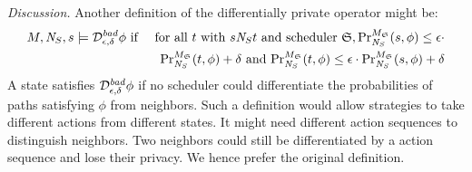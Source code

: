 \noindent
\emph{Discussion.}
Another definition of the differentially private operator
might be:
\begin{eqnarray*}
  M, \neighbor{S}, s \models \dpriv{\epsilon}{\delta}^{\mathit{bad}} \phi
  & \textmd{ if } &
  \textmd{for all } t \textmd{ with } s \neighbor{S} t \textmd{ and
  scheduler } \scheduler{S},
  \myPr{s}{M_{\scheduler{S}}}{\neighbor{S}}{\phi} \leq
  \epsilon \cdot\\
  && \myPr{t}{M_{\scheduler{S}}}{\neighbor{S}}{\phi} + \delta \textmd{ and }
  \myPr{t}{M_{\scheduler{S}}}{\neighbor{S}}{\phi} \leq
  \epsilon \cdot \myPr{s}{M_{\scheduler{S}}}{\neighbor{S}}{\phi}
  + \delta
\end{eqnarray*}
A state satisfies $\dpriv{\epsilon}{\delta}^{\mathit{bad}} \phi$ if
no scheduler could differentiate the probabilities of paths satisfying
$\phi$ from neighbors. Such a definition would allow strategies to
take different actions from different states. It might need different
action sequences to distinguish neighbors. Two neighbors could still be
differentiated by a action sequence and lose their privacy. We hence
prefer the original definition.

